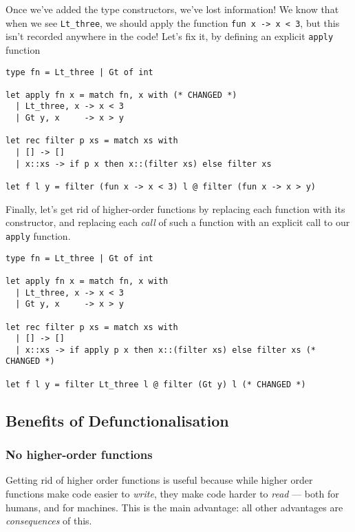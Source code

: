 Once we've added the type constructors, we've lost information! We know that when we see \texttt{Lt\_three}, we should apply the function \texttt{fun x -> x < 3}, but this isn't recorded anywhere in the code! Let's fix it, by defining an explicit \texttt{apply} function

\begin{code}
\label{code:defun-2}
\begin{verbatim}
type fn = Lt_three | Gt of int 

let apply fn x = match fn, x with (* CHANGED *)
  | Lt_three, x -> x < 3
  | Gt y, x     -> x > y
  
let rec filter p xs = match xs with 
  | [] -> []
  | x::xs -> if p x then x::(filter xs) else filter xs

let f l y = filter (fun x -> x < 3) l @ filter (fun x -> x > y)
\end{verbatim}
\end{code}

Finally, let's get rid of higher-order functions by replacing each function with its constructor, and replacing each \emph{call} of such a function with an explicit call to our \texttt{apply} function. 

\begin{code}
\label{code:defun-3}
\begin{verbatim}
type fn = Lt_three | Gt of int 

let apply fn x = match fn, x with
  | Lt_three, x -> x < 3
  | Gt y, x     -> x > y
  
let rec filter p xs = match xs with
  | [] -> []
  | x::xs -> if apply p x then x::(filter xs) else filter xs (* CHANGED *)

let f l y = filter Lt_three l @ filter (Gt y) l (* CHANGED *)
\end{verbatim}
\end{code}

\subsection{Benefits of Defunctionalisation}
\subsubsection{No higher-order functions}
Getting rid of higher order functions is useful because while higher order functions make code easier to \emph{write}, they make code harder to \emph{read} --- both for humans, and for machines. This is the main advantage: all other advantages are \emph{consequences} of this.

